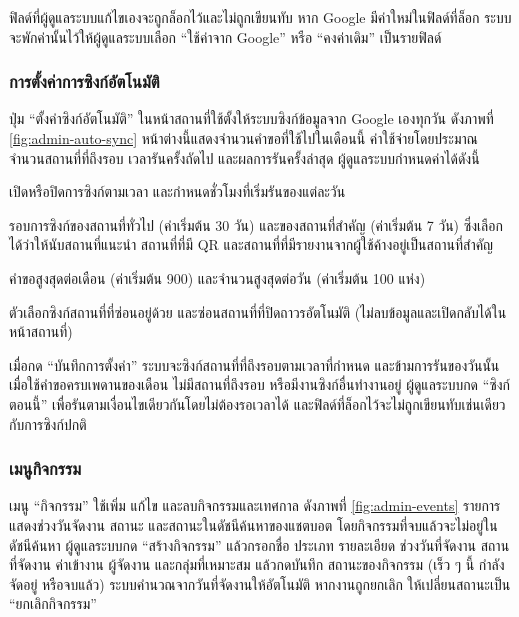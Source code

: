 
ฟิลด์ที่ผู้ดูแลระบบแก้ไขเองจะถูกล็อกไว้และไม่ถูกเขียนทับ หาก Google มีค่าใหม่ในฟิลด์ที่ล็อก ระบบจะพักค่านั้นไว้ให้ผู้ดูแลระบบเลือก ``ใช้ค่าจาก Google'' หรือ ``คงค่าเดิม'' เป็นรายฟิลด์

\subsubsection{การตั้งค่าการซิงก์อัตโนมัติ}

ปุ่ม ``ตั้งค่าซิงก์อัตโนมัติ'' ในหน้าสถานที่ใช้ตั้งให้ระบบซิงก์ข้อมูลจาก Google เองทุกวัน ดังภาพที่ \ref{fig:admin-auto-sync} หน้าต่างนี้แสดงจำนวนคำขอที่ใช้ไปในเดือนนี้ ค่าใช้จ่ายโดยประมาณ จำนวนสถานที่ที่ถึงรอบ เวลารันครั้งถัดไป และผลการรันครั้งล่าสุด ผู้ดูแลระบบกำหนดค่าได้ดังนี้

\begin{numlist}
\item เปิดหรือปิดการซิงก์ตามเวลา และกำหนดชั่วโมงที่เริ่มรันของแต่ละวัน
\item รอบการซิงก์ของสถานที่ทั่วไป (ค่าเริ่มต้น 30 วัน) และของสถานที่สำคัญ (ค่าเริ่มต้น 7 วัน) ซึ่งเลือกได้ว่าให้นับสถานที่แนะนำ สถานที่ที่มี QR และสถานที่ที่มีรายงานจากผู้ใช้ค้างอยู่เป็นสถานที่สำคัญ
\item คำขอสูงสุดต่อเดือน (ค่าเริ่มต้น 900) และจำนวนสูงสุดต่อวัน (ค่าเริ่มต้น 100 แห่ง)
\item ตัวเลือกซิงก์สถานที่ที่ซ่อนอยู่ด้วย และซ่อนสถานที่ที่ปิดถาวรอัตโนมัติ (ไม่ลบข้อมูลและเปิดกลับได้ในหน้าสถานที่)
\end{numlist}


เมื่อกด ``บันทึกการตั้งค่า'' ระบบจะซิงก์สถานที่ที่ถึงรอบตามเวลาที่กำหนด และข้ามการรันของวันนั้นเมื่อใช้คำขอครบเพดานของเดือน ไม่มีสถานที่ถึงรอบ หรือมีงานซิงก์อื่นทำงานอยู่ ผู้ดูแลระบบกด ``ซิงก์ตอนนี้'' เพื่อรันตามเงื่อนไขเดียวกันโดยไม่ต้องรอเวลาได้ และฟิลด์ที่ล็อกไว้จะไม่ถูกเขียนทับเช่นเดียวกับการซิงก์ปกติ

\subsubsection{เมนูกิจกรรม}

เมนู ``กิจกรรม'' ใช้เพิ่ม แก้ไข และลบกิจกรรมและเทศกาล ดังภาพที่ \ref{fig:admin-events} รายการแสดงช่วงวันจัดงาน สถานะ และสถานะในดัชนีค้นหาของแชตบอต โดยกิจกรรมที่จบแล้วจะไม่อยู่ในดัชนีค้นหา ผู้ดูแลระบบกด ``สร้างกิจกรรม'' แล้วกรอกชื่อ ประเภท รายละเอียด ช่วงวันที่จัดงาน สถานที่จัดงาน ค่าเข้างาน ผู้จัดงาน และกลุ่มที่เหมาะสม แล้วกดบันทึก สถานะของกิจกรรม (เร็ว ๆ นี้ กำลังจัดอยู่ หรือจบแล้ว) ระบบคำนวณจากวันที่จัดงานให้อัตโนมัติ หากงานถูกยกเลิก ให้เปลี่ยนสถานะเป็น ``ยกเลิกกิจกรรม''

